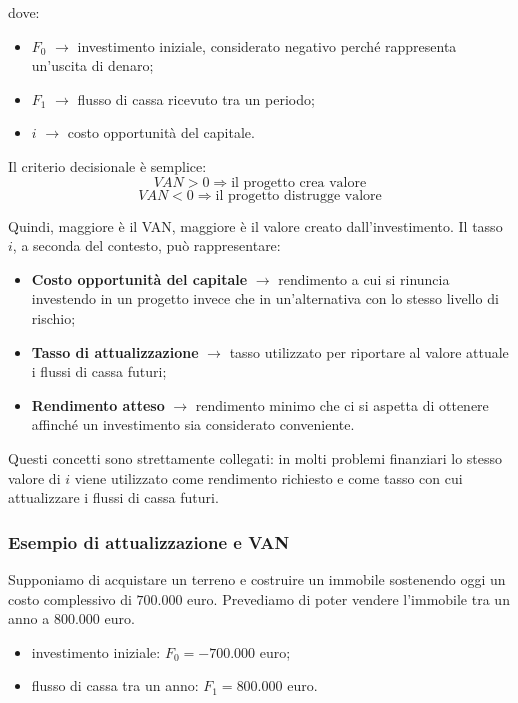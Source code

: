 \noindent dove:
\begin{itemize}
    \item \(F_0\) $\rightarrow$ investimento iniziale, considerato negativo perché rappresenta un'uscita di denaro;
    \item \(F_1\) $\rightarrow$ flusso di cassa ricevuto tra un periodo;
    \item \(i\) $\rightarrow$ costo opportunità del capitale.
\end{itemize}

\noindent Il criterio decisionale è semplice:
\[
VAN > 0 \Rightarrow \text{il progetto crea valore}
\]
\[
VAN < 0 \Rightarrow \text{il progetto distrugge valore}
\]

\noindent Quindi, maggiore è il VAN, maggiore è il valore creato dall'investimento.
\noindent Il tasso \(i\), a seconda del contesto, può rappresentare:
\begin{itemize}
    \item \textbf{Costo opportunità del capitale} $\rightarrow$ rendimento a cui si rinuncia investendo in un progetto invece che in un'alternativa con lo 
    stesso livello di rischio;
    \item \textbf{Tasso di attualizzazione} $\rightarrow$ tasso utilizzato per riportare al valore attuale i flussi di cassa futuri;
    \item \textbf{Rendimento atteso} $\rightarrow$ rendimento minimo che ci si aspetta di ottenere affinché un investimento sia considerato conveniente.
\end{itemize}

\noindent Questi concetti sono strettamente collegati: in molti problemi finanziari lo stesso valore di \(i\) viene utilizzato come rendimento richiesto e come tasso 
con cui attualizzare i flussi di cassa futuri.
\subsubsection*{Esempio di attualizzazione e VAN}

Supponiamo di acquistare un terreno e costruire un immobile sostenendo oggi un costo complessivo di \(700.000\) euro. Prevediamo di 
poter vendere l'immobile tra un anno a \(800.000\) euro.

\begin{itemize}
    \item investimento iniziale: \(F_0 = -700.000\) euro;
    \item flusso di cassa tra un anno: \(F_1 = 800.000\) euro.
\end{itemize}

